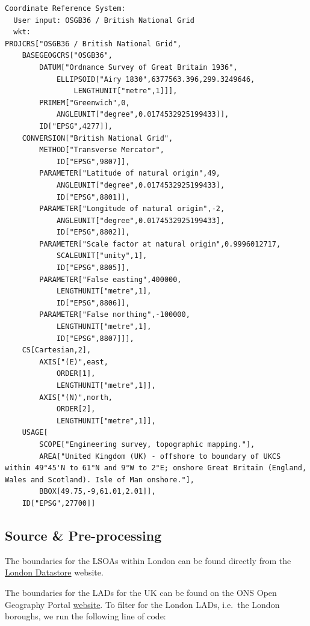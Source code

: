 \documentclass[
  letterpaper,
  DIV=11,
  numbers=noendperiod]{scrreprt}
\begin{document}
\begin{verbatim}
Coordinate Reference System:
  User input: OSGB36 / British National Grid 
  wkt:
PROJCRS["OSGB36 / British National Grid",
    BASEGEOGCRS["OSGB36",
        DATUM["Ordnance Survey of Great Britain 1936",
            ELLIPSOID["Airy 1830",6377563.396,299.3249646,
                LENGTHUNIT["metre",1]]],
        PRIMEM["Greenwich",0,
            ANGLEUNIT["degree",0.0174532925199433]],
        ID["EPSG",4277]],
    CONVERSION["British National Grid",
        METHOD["Transverse Mercator",
            ID["EPSG",9807]],
        PARAMETER["Latitude of natural origin",49,
            ANGLEUNIT["degree",0.0174532925199433],
            ID["EPSG",8801]],
        PARAMETER["Longitude of natural origin",-2,
            ANGLEUNIT["degree",0.0174532925199433],
            ID["EPSG",8802]],
        PARAMETER["Scale factor at natural origin",0.9996012717,
            SCALEUNIT["unity",1],
            ID["EPSG",8805]],
        PARAMETER["False easting",400000,
            LENGTHUNIT["metre",1],
            ID["EPSG",8806]],
        PARAMETER["False northing",-100000,
            LENGTHUNIT["metre",1],
            ID["EPSG",8807]]],
    CS[Cartesian,2],
        AXIS["(E)",east,
            ORDER[1],
            LENGTHUNIT["metre",1]],
        AXIS["(N)",north,
            ORDER[2],
            LENGTHUNIT["metre",1]],
    USAGE[
        SCOPE["Engineering survey, topographic mapping."],
        AREA["United Kingdom (UK) - offshore to boundary of UKCS within 49°45'N to 61°N and 9°W to 2°E; onshore Great Britain (England, Wales and Scotland). Isle of Man onshore."],
        BBOX[49.75,-9,61.01,2.01]],
    ID["EPSG",27700]]
\end{verbatim}

\hypertarget{source-pre-processing-1}{%
\subsection*{Source \& Pre-processing}\label{source-pre-processing-1}}

The boundaries for the LSOAs within London can be found directly from
the
\href{https://data.london.gov.uk/dataset/statistical-gis-boundary-files-london}{London
Datastore} website.

The boundaries for the LADs for the UK can be found on the ONS Open
Geography Portal
\href{https://geoportal.statistics.gov.uk/search?collection=Dataset\&sort=name\&tags=all(BDY_LAD\%2CDEC_2022)}{website}.
To filter for the London LADs, i.e.~the London boroughs, we run the
following line of code:
\end{document}
